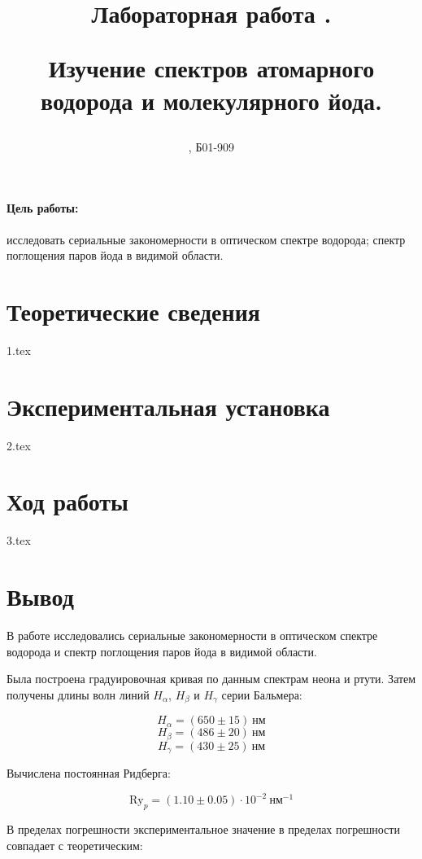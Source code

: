 \documentclass[a5paper, 10pt, twoside]{article} %
\title
{\hfill \break  \hfill \break
\hfill \break  \hfill \break
Лабораторная работа \LNUM.

Изучение спектров атомарного водорода и молекулярного йода.
}
\author{\SMB, Б01-909}
\begin{document}
\maketitle



\thispagestyle{empty} %

\newpage

\tableofcontents %
\thispagestyle{plain}
\newpage


\paragraph{Цель работы:}
исследовать сериальные закономерности в оптическом спектре водорода; спектр
поглощения паров йода в видимой области.

\section{Теоретические сведения}
{1.tex}

\newpage
\section{Экспериментальная установка}
{2.tex}

\newpage
\section{Ход работы}
{3.tex}

\newpage
\section{Вывод}

В работе исследовались сериальные закономерности в оптическом спектре водорода и
спектр поглощения паров йода в видимой области.

Была построена градуировочная кривая по данным спектрам неона и ртути. Затем
получены длины волн линий $H_{\alpha}$, $H_{\beta}$ и $H_{\gamma}$ серии
Бальмера:

\[  H_{\alpha} = (650\pm 15)\ \text{нм} \]
\[  H_{\beta} = (486\pm 20)\ \text{нм} \]
\[  H_{\gamma} = (430\pm  25)\  \text{нм} \]


Вычислена постоянная Ридберга:

\[ \text{Ry}_p=(1.10\pm 0.05)\cdot 10^{-2} ~\text{нм}^{-1} \]

В пределах погрешности экспериментальное значение в пределах погрешности
совпадает с теоретическим:
\end{document}
